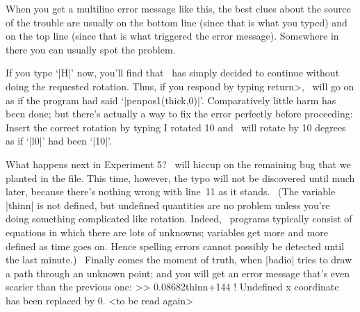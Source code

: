 When you get a multiline error message like this, the best clues about the
source of the trouble are usually on the bottom line (since that is what
you typed) and on the top line (since that is what triggered the error
message). Somewhere in there you can usually spot the problem.

If you type `|H|' now, you'll find that
\MF\ has simply decided to continue without doing the requested rotation.
Thus, if you respond by typing \<return>, \MF\ will go on as if the program
had said `|penpos1(thick,0)|'. Comparatively little harm has been done;
but there's actually a way to fix the error perfectly before proceeding:
Insert the correct rotation by typing
\begintt
I rotated 10
\endtt
and \MF\ will rotate by 10 degrees as if `|l0|' had been `|10|'.

What happens next in Experiment 5? \MF\ will hiccup on the remaining
bug that we planted in the file. This time, however, the typo will
not be discovered until much later, because there's nothing wrong
with line~11 as it stands. \ (The variable |thinn| is not defined,
but undefined quantities are no problem unless you're doing something
complicated like rotation. Indeed, \MF\ programs typically
consist of equations in which there are lots of unknowns;
variables get more and more defined as time goes on. Hence spelling
errors cannot possibly be detected until the last minute.) \
Finally comes the moment of truth, when |badio| tries to draw a
path through an unknown point; and you will get an error message
that's even scarier than the previous one:
\begintt
>> 0.08682thinn+144
! Undefined x coordinate has been replaced by 0.
<to be read again>

